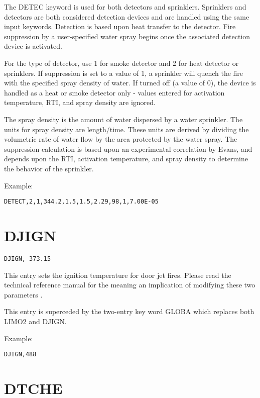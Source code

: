 The DETEC keyword is used for both detectors and sprinklers. Sprinklers and detectors are both considered detection devices and are handled using the same input keywords.  Detection is based upon heat transfer to the detector. Fire suppression by a user-specified water spray begins once the associated detection device is activated.

For the type of detector, use 1 for smoke detector and 2 for heat detector or sprinklers. If suppression is set to a value of 1, a sprinkler will quench the fire with the specified spray density of water. If turned off (a value of 0), the device is handled as a heat or smoke detector only - values entered for activation temperature, RTI, and spray density are ignored.

The spray density is the amount of water dispersed by a water sprinkler.  The units for spray density are length/time.  These units are derived by dividing the volumetric rate of water flow by the area protected by the water spray. The suppression calculation is based upon an experimental correlation by Evans, and depends upon the RTI, activation temperature, and spray density to determine the behavior of the sprinkler.

Example:

\begin{lstlisting}
DETECT,2,1,344.2,1.5,1.5,2.29,98,1,7.00E-05
\end{lstlisting}

\section{DJIGN}

\begin{lstlisting}
DJIGN, 373.15
\end{lstlisting}

This entry sets the ignition temperature for door jet fires. Please read the technical reference manual for the meaning an implication of modifying these two parameters \cite{CFAST_Tech_Guide_6}.

This entry is superceded by the two-entry key word GLOBA which replaces both LIMO2 and DJIGN.

Example:

\begin{lstlisting}
DJIGN,488
\end{lstlisting}

\section{DTCHE}

